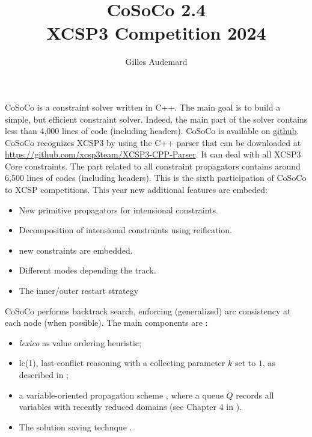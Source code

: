 \documentclass{llncs}
\newcommand{\h}[1]{\textit{#1}} %
\begin{document}
\pagestyle{empty}


\title{CoSoCo 2.4\\ {\small XCSP3 Competition 2024}}

\author{Gilles Audemard}



\maketitle




 CoSoCo is a constraint solver written in
C++. The main goal is to build
a simple, but efficient constraint solver. Indeed, the main part of
the solver contains less than 4,000 lines of code (including headers). CoSoCo is available on
\href{https://github.com/xcsp3team/cosoco}{github}. CoSoCo recognizes XCSP3
\cite{BLPPxcsp3} by using the C++ parser that can be downloaded at
\href{https://github.com/xcsp3team/XCSP3-CPP-Parser}{https://github.com/xcsp3team/XCSP3-CPP-Parser}. It
can deal with all XCSP3 Core constraints. The part related to
all constraint propagators contains around 6,500 lines of codes (including headers).
This is the sixth participation of CoSoCo to XCSP competitions.   This year new additional features are embeded:
\begin{itemize}
\item New primitive propagators for intensional constraints.
\item Decomposition of intensional constraints using reification.
\item new constraints are embedded.
\item Different modes depending the track.
  \item The inner/outer restart strategy \cite{inner}
\end{itemize}  

 
\bigskip
CoSoCo performs backtrack search, enforcing (generalized) arc consistency at each node (when possible).  
The main components are :
\begin{itemize}
\item \h{lexico} as value ordering heuristic;
\item lc(1), last-conflict reasoning with a collecting parameter $k$ set to $1$, as described in \cite{LSTV_reasonning};
\item a variable-oriented propagation scheme \cite{G_relational}, where a queue $Q$ records all variables with recently reduced domains (see Chapter 4 in \cite{L_constraint}).
\item The solution saving technque \cite{vion2017}.
\end{itemize}
\end{document}
